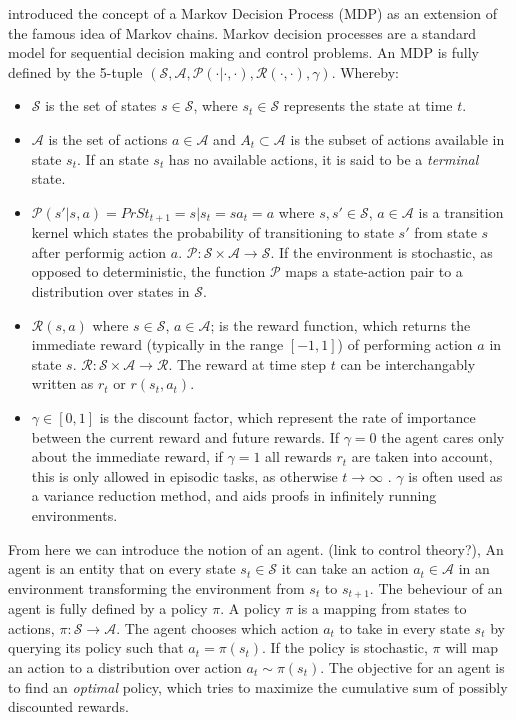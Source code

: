 \documentclass{../main.tex}{subfiles}
\begin{document}
\cite{Bellman1957} introduced the concept of a Markov Decision Process (MDP) as an extension of the famous idea of Markov chains. Markov decision processes are a standard model for sequential decision making and control problems. An MDP is fully defined by the 5-tuple $(\mathcal{S}, \mathcal{A}, \mathcal{P(\cdot | \cdot, \cdot)}, \mathcal{R(\cdot, \cdot)}, \gamma)$. Whereby:

\begin{itemize}
\item $\mathcal{S}$ is the set of states $s \in \mathcal{S}$, where $s_t \in \mathcal{S}$ represents the state at time $t$.
\item $\mathcal{A}$ is the set of actions $a \in \mathcal{A}$ and $A_t \subset \mathcal{A}$ is the subset of actions available in state $s_t$. If an state $s_t$ has no available actions, it is said to be a \textit{terminal} state.
\item $\mathcal{P}(s' | s, a) = Pr{St_{t+1} = s | s_t = s a_t = a}$ where $s, s' \in \mathcal{S}$, $a \in \mathcal{A}$ is a transition kernel which states the probability of transitioning to state $s'$ from state $s$ after performig action $a$. $\mathcal{P}: \mathcal{S} \times \mathcal{A} \to \mathcal{S}$. If the environment is stochastic, as opposed to deterministic, the function $\mathcal{P}$ maps a state-action pair to a distribution over states in $\mathcal{S}$. 
\item $\mathcal{R}(s, a)$ where $s \in \mathcal{S}$, $a \in \mathcal{A}$; is the reward function, which returns the immediate reward (typically in the range $[-1,1]$) of performing action $a$ in state $s$. $\mathcal{R}: \mathcal{S} \times \mathcal{A} \to \mathbb{\mathcal{R}}$. The reward at time step $t$ can be interchangably written as $r_t$ or $r(s_t, a_t)$.
\item $\gamma \in [0,1]$ is the discount factor, which represent the rate of importance between the current reward and future rewards. If $\gamma = 0$ the agent cares only about the immediate reward, if $\gamma = 1$ all rewards $r_t$ are taken into account, this is only allowed in episodic tasks, as otherwise $t \rightarrow \infty$ \citep{Sutton1999}. $\gamma$ is often used as a variance reduction method, and aids proofs in infinitely running environments.
\end{itemize}


From here we can introduce the notion of an agent. (link to control theory?), An agent is an entity that on every state $s_t \in \mathcal{S}$ it can take an action $a_t \in \mathcal{A}$ in an environment transforming the environment from $s_t$ to $s_{t+1}$. The beheviour of an agent is fully defined by a policy $\pi$. A policy $\pi$ is a mapping from states to actions, $\pi: \mathcal{S} \to \mathcal{A}$. The agent chooses which action $a_t$ to take in every state $s_t$ by querying its policy such that $a_t = \pi(s_t)$. If the policy is stochastic, $\pi$ will map an action to a distribution over action $a_t \sim \pi(s_t)$. The objective for an agent is to find an \textit{optimal} policy, which tries to maximize the cumulative sum of possibly discounted rewards.
\end{document}
